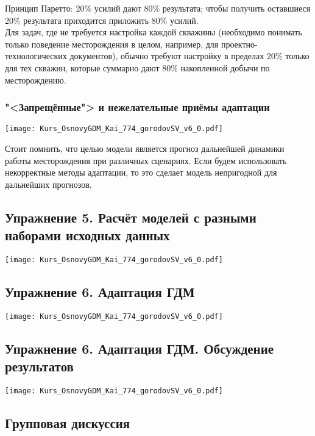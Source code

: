 \documentclass[main.tex]{subfiles}
\begin{document}
Принцип Паретто: 20\% усилий дают 80\% результата; чтобы получить оставшиеся 20\% результата приходится приложить 80\% усилий.\\

Для задач, где не требуется настройка каждой скважины (необходимо понимать только поведение месторождения в целом, например, для проектно-технологических документов), обычно требуют настройку в пределах 20\% только для тех скважин, которые суммарно дают 80\% накопленной добычи по месторождению. 

\subsubsection{"<Запрещённые"> и нежелательные приёмы адаптации}

\texttt{[image: Kurs\_OsnovyGDM\_Kai\_774\_gorodovSV\_v6\_0.pdf]}

Стоит помнить, что целью модели является прогноз дальнейшей динамики работы месторождения при различных сценариях.
Если будем использовать некорректные методы адаптации, то это сделает модель непригодной для дальнейших прогнозов.

\subsection{Упражнение 5. Расчёт моделей с разными наборами исходных данных}

\texttt{[image: Kurs\_OsnovyGDM\_Kai\_774\_gorodovSV\_v6\_0.pdf]}

\subsection{Упражнение 6. Адаптация ГДМ}

\texttt{[image: Kurs\_OsnovyGDM\_Kai\_774\_gorodovSV\_v6\_0.pdf]}

\subsection{Упражнение 6. Адаптация ГДМ. Обсуждение результатов}

\texttt{[image: Kurs\_OsnovyGDM\_Kai\_774\_gorodovSV\_v6\_0.pdf]}

\subsection{Групповая дискуссия}
\end{document}
